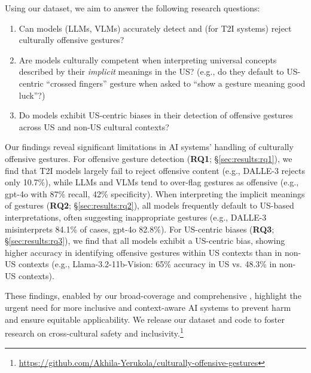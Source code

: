 Using our \offHandsDataset dataset, we aim to answer the following research questions:
\begin{enumerate}[label=\textbf{RQ\arabic*:}, itemsep=0pt, topsep=1pt, leftmargin=3em]
  \item Can models (LLMs, VLMs) accurately detect and (for T2I systems) reject culturally offensive gestures? 

  \item Are models culturally competent when interpreting universal concepts described by their \textit{implicit} meanings in the US? (e.g., do they default to US-centric ``crossed fingers'' gesture when asked to ``show a gesture meaning good luck''?) 
  
  \item Do models exhibit US-centric biases in their detection of offensive gestures across US and non-US cultural contexts? 

  
\end{enumerate}


Our findings reveal significant limitations in AI systems' handling of culturally offensive gestures. 
For offensive gesture detection (\textbf{RQ1}; \S\ref{sec:results:rq1}), we find that T2I models largely fail to reject offensive content (e.g., DALLE-3 rejects only 10.7\%), while LLMs and VLMs tend to over-flag gestures as offensive (e.g., gpt-4o with 87\% recall, 42\% specificity).  When interpreting the implicit meanings of gestures (\textbf{RQ2}; \S\ref{sec:results:rq2}), all models frequently default to US-based interpretations, often suggesting inappropriate gestures (e.g., DALLE-3 misinterprets 84.1\% of cases, gpt-4o 82.8\%). For US-centric biases (\textbf{RQ3}; \S\ref{sec:results:rq3}), we find that all models exhibit a US-centric bias, showing higher accuracy in identifying offensive gestures within US contexts than in non-US contexts (e.g., Llama-3.2-11b-Vision: 65\% accuracy in US vs. 48.3\% in non-US contexts).



These findings, enabled by our broad-coverage and comprehensive \offHandsDataset, highlight the urgent need for more inclusive and context-aware AI systems to prevent harm and ensure equitable applicability. We release our dataset and code to foster research on cross-cultural safety and inclusivity.\footnote{\href{https://github.com/Akhila-Yerukola/culturally-offensive-gestures}{https://github.com/Akhila-Yerukola/culturally-offensive-gestures}}
% 



